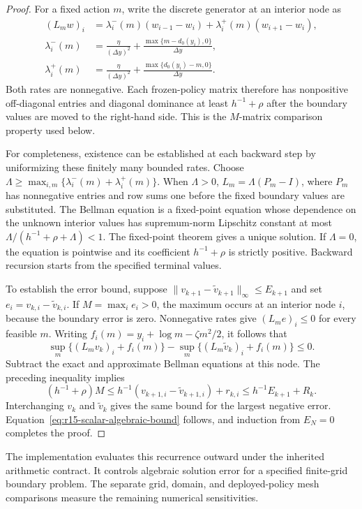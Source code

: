 \begin{proof}
For a fixed action $m$, write the discrete generator at an interior node as
\[
 \begin{aligned}
 (L_mw)_i&=\lambda_i^-(m)(w_{i-1}-w_i)
            +\lambda_i^+(m)(w_{i+1}-w_i),\\
 \lambda_i^-(m)&=\frac{\eta}{(\Delta y)^2}
                 +\frac{\max\{m-d_0(y_i),0\}}{\Delta y},\\
 \lambda_i^+(m)&=\frac{\eta}{(\Delta y)^2}
                 +\frac{\max\{d_0(y_i)-m,0\}}{\Delta y}.
 \end{aligned}
\]
Both rates are nonnegative.  Each frozen-policy matrix therefore has
nonpositive off-diagonal entries and diagonal dominance at least
$h^{-1}+\rho$ after the boundary values are moved to the right-hand side.
This is the $M$-matrix comparison property used below.

For completeness, existence can be established at each backward step by
uniformizing these finitely many bounded rates.  Choose
$\Lambda\ge\max_{i,m}\{\lambda_i^-(m)+\lambda_i^+(m)\}$.
When $\Lambda>0$, $L_m=\Lambda(P_m-I)$, where $P_m$ has nonnegative
entries and row sums one before the fixed boundary values are substituted.
The Bellman equation is a fixed-point equation whose dependence on the
unknown interior values has supremum-norm Lipschitz constant at most
$\Lambda/(h^{-1}+\rho+\Lambda)<1$.  The fixed-point theorem gives a
unique solution.  If $\Lambda=0$, the equation is pointwise and its
coefficient $h^{-1}+\rho$ is strictly positive.  Backward recursion starts
from the specified terminal values.

To establish the error bound, suppose
$\|v_{k+1}-\widetilde v_{k+1}\|_\infty\le E_{k+1}$ and set
$e_i=v_{k,i}-\widetilde v_{k,i}$.  If $M=\max_i e_i>0$, the maximum
occurs at an interior node $i$, because the boundary error is zero.
Nonnegative rates give $(L_me)_i\le0$ for every feasible $m$.
Writing $f_i(m)=y_i+\log m-\zeta m^2/2$, it follows that
\[
 \sup_m\{(L_mv_k)_i+f_i(m)\}
 -\sup_m\{(L_m\widetilde v_k)_i+f_i(m)\}\le0.
\]
Subtract the exact and approximate Bellman equations at this node.
The preceding inequality implies
\[
 (h^{-1}+\rho)M
 \le h^{-1}(v_{k+1,i}-\widetilde v_{k+1,i})+r_{k,i}
 \le h^{-1}E_{k+1}+R_k.
\]
Interchanging $v_k$ and $\widetilde v_k$ gives the same bound for the
largest negative error.  Equation~\eqref{eq:r15-scalar-algebraic-bound}
follows, and induction from $E_N=0$ completes the proof.
\end{proof}

The implementation evaluates this recurrence outward under the inherited
arithmetic contract.  It controls algebraic solution error for a specified
finite-grid boundary problem.  The separate grid, domain, and deployed-policy
mesh comparisons measure the remaining numerical sensitivities.

